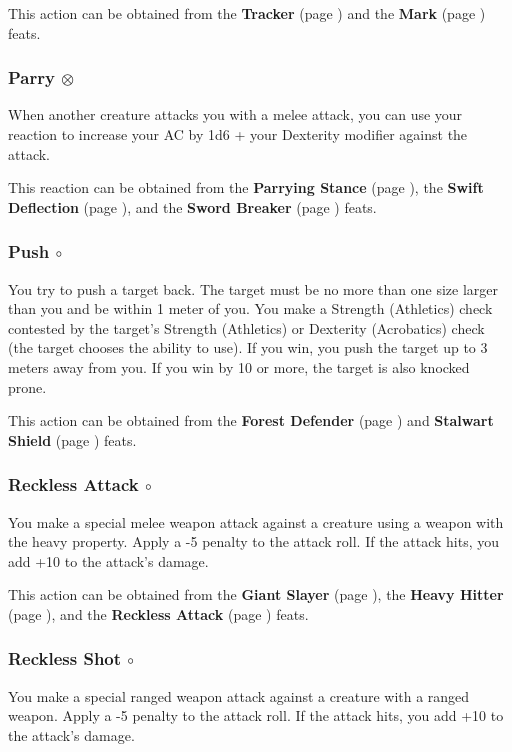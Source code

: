         This action can be obtained from the \textbf{Tracker} (page \pageref{feat::tracker}) and the \textbf{Mark} (page \pageref{feat::mark}) feats.
    \subsubsection{Parry $\otimes$} \label{act::parry}
        When another creature attacks you with a melee attack, you can use your reaction to increase your AC by 1d6 + your Dexterity modifier against the attack.

        This reaction can be obtained from the \textbf{Parrying Stance} (page \pageref{feat::parryingstance}), the \textbf{Swift Deflection} (page \pageref{feat::swiftdeflection}), and the \textbf{Sword Breaker} (page \pageref{feat::swordbreaker}) feats.
    \subsubsection{Push $\circ$} \label{act::push}
        You try to push a target back.
        The target must be no more than one size larger than you and be within 1 meter of you.
        You make a Strength (Athletics) check contested by the target's Strength (Athletics) or Dexterity (Acrobatics) check (the target chooses the ability to use).
        If you win, you push the target up to 3 meters away from you.
        If you win by 10 or more, the target is also knocked prone.

        This action can be obtained from the \textbf{Forest Defender} (page \pageref{feat::forestdefender}) and \textbf{Stalwart Shield} (page \pageref{feat::stalwartshield}) feats.
    \subsubsection{Reckless Attack $\circ$} \label{act::recklessattack}
        You make a special melee weapon attack against a creature using a weapon with the heavy property.
        Apply a -5 penalty to the attack roll.
        If the attack hits, you add +10 to the attack's damage.

        This action can be obtained from the \textbf{Giant Slayer} (page \pageref{feat::giantslayer}), the \textbf{Heavy Hitter} (page \pageref{feat::heavyhitter}), and the \textbf{Reckless Attack} (page \pageref{feat::recklessattack}) feats.
    \subsubsection{Reckless Shot $\circ$} \label{act::recklessshot}
        You make a special ranged weapon attack against a creature with a ranged weapon.
        Apply a -5 penalty to the attack roll.
        If the attack hits, you add +10 to the attack's damage.

